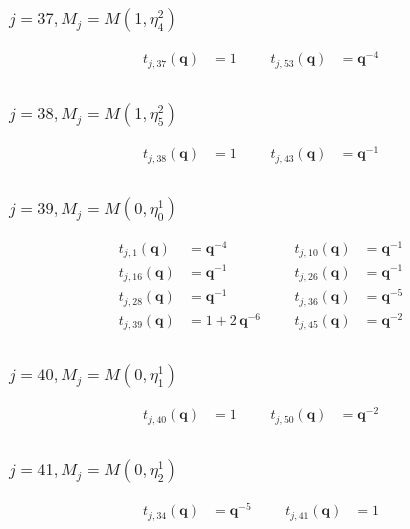 \subsubsection{$j=37, M_{j}=M(1,\eta^{2}_{4})$}
\begin{align*}
t_{j,37}(\boldsymbol{q})&=1 &&& t_{j,53}(\boldsymbol{q})&=\boldsymbol{q}^{-4} \\
\end{align*}

\subsubsection{$j=38, M_{j}=M(1,\eta^{2}_{5})$}
\begin{align*}
t_{j,38}(\boldsymbol{q})&=1 &&& t_{j,43}(\boldsymbol{q})&=\boldsymbol{q}^{-1} \\
\end{align*}

\subsubsection{$j=39, M_{j}=M(0,\eta^{1}_{0})$}
\begin{align*}
t_{j,1}(\boldsymbol{q})&=\boldsymbol{q}^{-4} &&& t_{j,10}(\boldsymbol{q})&=\boldsymbol{q}^{-1} \\
t_{j,16}(\boldsymbol{q})&=\boldsymbol{q}^{-1} &&& t_{j,26}(\boldsymbol{q})&=\boldsymbol{q}^{-1} \\
t_{j,28}(\boldsymbol{q})&=\boldsymbol{q}^{-1} &&& t_{j,36}(\boldsymbol{q})&=\boldsymbol{q}^{-5} \\
t_{j,39}(\boldsymbol{q})&=1 + 2\,\boldsymbol{q}^{-6} &&& t_{j,45}(\boldsymbol{q})&=\boldsymbol{q}^{-2} \\
\end{align*}

\subsubsection{$j=40, M_{j}=M(0,\eta^{1}_{1})$}
\begin{align*}
t_{j,40}(\boldsymbol{q})&=1 &&& t_{j,50}(\boldsymbol{q})&=\boldsymbol{q}^{-2} \\
\end{align*}

\subsubsection{$j=41, M_{j}=M(0,\eta^{1}_{2})$}
\begin{align*}
t_{j,34}(\boldsymbol{q})&=\boldsymbol{q}^{-5} &&& t_{j,41}(\boldsymbol{q})&=1 \\
\end{align*}

